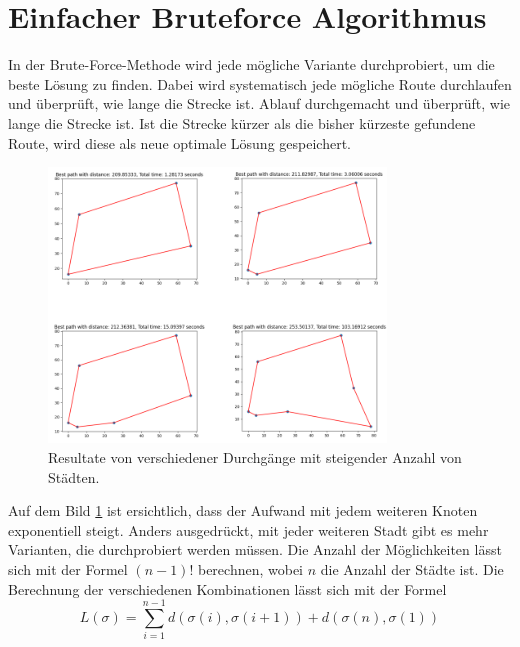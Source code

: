 %
%
%
%
\section{Einfacher Bruteforce Algorithmus
  \label{buch:paper:varalg:section:bruteforce}}
In der Brute-Force-Methode wird jede mögliche Variante durchprobiert,
um die beste Lösung zu finden. Dabei wird systematisch jede mögliche
Route durchlaufen und überprüft, wie lange die Strecke ist.
Ablauf durchgemacht und überprüft, wie lange die Strecke ist.
Ist die Strecke kürzer als die bisher kürzeste gefundene Route,
wird diese als neue optimale Lösung gespeichert.
\begin{figure}
    \centering
    \includegraphics[width=0.8\textwidth]{papers/varalg/images/teil2/02BruteforceMethode.png}
    \caption{Resultate von verschiedener Durchgänge mit steigender Anzahl von Städten.
        \label{fig:results_bruteforce}}
\end{figure}
Auf dem Bild \ref{fig:results_bruteforce} ist ersichtlich, dass der
Aufwand mit jedem weiteren Knoten  exponentiell steigt. Anders
ausgedrückt, mit jeder weiteren Stadt gibt es mehr Varianten, die
durchprobiert werden müssen. Die Anzahl der Möglichkeiten lässt sich
mit der Formel \((n-1)!\) berechnen, wobei \(n\) die Anzahl der Städte ist.
Die Berechnung der verschiedenen Kombinationen lässt sich mit der
Formel
\begin{equation}
    L(\sigma)
    =
    \sum_{i=1}^{n-1} d(\sigma(i), \sigma(i+1)) + d(\sigma(n), \sigma(1))
    \label{eq:bruteforce_min_formula}
\end{equation}

